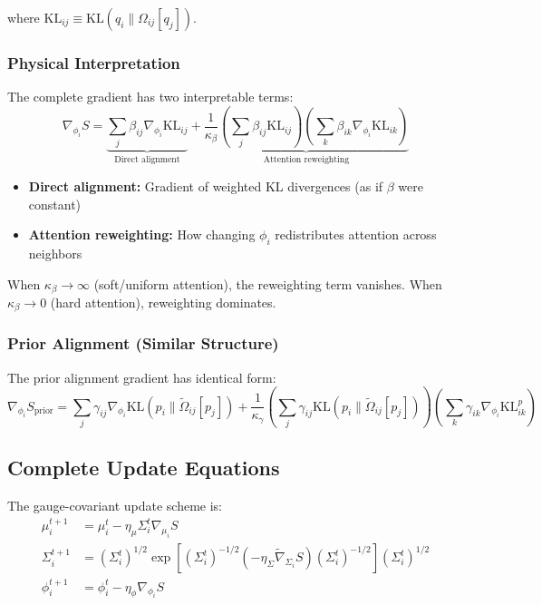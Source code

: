 \documentclass[11pt]{article}
\begin{document}
where $\mathrm{KL}_{ij} \equiv \mathrm{KL}(q_i \| \Omega_{ij}[q_j])$.

\subsubsection*{Physical Interpretation}

The complete gradient has two interpretable terms:
\begin{equation}
\boxed{\nabla_{\phi_i} S = \underbrace{\sum_j \beta_{ij}\nabla_{\phi_i}\mathrm{KL}_{ij}}_{\text{Direct alignment}} + \underbrace{\frac{1}{\kappa_\beta}\left(\sum_j \beta_{ij}\mathrm{KL}_{ij}\right) \left(\sum_k \beta_{ik}\nabla_{\phi_i}\mathrm{KL}_{ik}\right)}_{\text{Attention reweighting}}}
\end{equation}

\begin{itemize}
\item \textbf{Direct alignment:} Gradient of weighted KL divergences (as if $\beta$ were constant)
\item \textbf{Attention reweighting:} How changing $\phi_i$ redistributes attention across neighbors
\end{itemize}

When $\kappa_\beta \to \infty$ (soft/uniform attention), the reweighting term vanishes. When $\kappa_\beta \to 0$ (hard attention), reweighting dominates.

\subsubsection*{Prior Alignment (Similar Structure)}

The prior alignment gradient has identical form:
\begin{equation}
\nabla_{\phi_i} S_{\mathrm{prior}} = \sum_j \gamma_{ij}\nabla_{\phi_i}\mathrm{KL}(p_i \| \tilde{\Omega}_{ij}[p_j]) + \frac{1}{\kappa_\gamma}\left(\sum_j \gamma_{ij}\mathrm{KL}(p_i \| \tilde{\Omega}_{ij}[p_j])\right)\left(\sum_k \gamma_{ik}\nabla_{\phi_i}\mathrm{KL}_{ik}^p\right)
\end{equation}

\subsection*{Complete Update Equations}

The gauge-covariant update scheme is:
\begin{align}
\mu_i^{t+1} &= \mu_i^t - \eta_\mu \Sigma_i^t \nabla_{\mu_i} S \\
\Sigma_i^{t+1} &= \left(\Sigma_i^t\right)^{1/2} \exp\left[\left(\Sigma_i^t\right)^{-1/2}\left(-\eta_\Sigma \tilde{\nabla}_{\Sigma_i} S\right)\left(\Sigma_i^t\right)^{-1/2}\right] \left(\Sigma_i^t\right)^{1/2} \\
\phi_i^{t+1} &= \phi_i^t - \eta_\phi \nabla_{\phi_i} S
\end{align}
\end{document}
